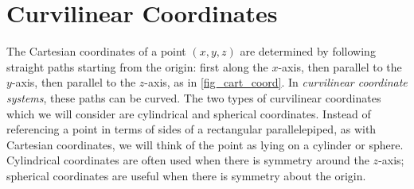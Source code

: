 \section{Curvilinear Coordinates}\label{sec:other_systems}



The Cartesian coordinates of a point $(x,y,z)$ are determined by following straight paths starting from the origin: first along the $x$-axis, then parallel to the $y$-axis, then parallel to the $z$-axis, as in \autoref{fig_cart_coord}. In \emph{curvilinear coordinate systems}, these paths can be curved. The two types of curvilinear coordinates which we will consider are cylindrical and spherical coordinates. Instead of referencing a point in terms of sides of a rectangular parallelepiped, as with Cartesian coordinates, we will think of the point as lying on a cylinder or sphere. Cylindrical coordinates are often used when there is symmetry around the $z$-axis; spherical coordinates are useful when there is symmetry about the origin.

